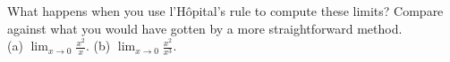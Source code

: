 What happens when you use l'H\^{o}pital's rule to compute these 
limits? Compare against what you would have gotten by a more straightforward method.\\
(a) $\displaystyle\lim_{x\to 0} \frac{x^2} {x}$.\hwendpart
(b) $\displaystyle\lim_{x\to 0} \frac{x^2} {x^3}$.\hwendpart
